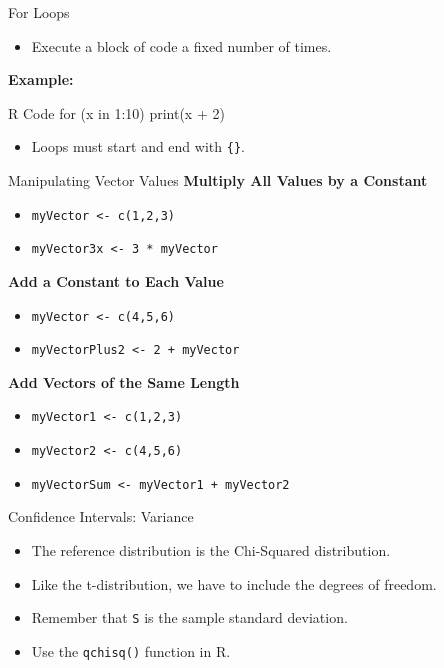 \documentclass{beamer}
\begin{document}
\begin{frame}{For Loops}
    \begin{itemize}
        \item Execute a block of code a fixed number of times.
    \end{itemize}

    \textbf{Example:}
    \begin{block}{R Code}
for (x in 1:10) {
    print(x + 2)
}
    \end{block}
    \begin{itemize}
        \item Loops must start and end with \texttt{\{\}}.
    \end{itemize}
\end{frame}

\begin{frame}{Manipulating Vector Values}
    \textbf{Multiply All Values by a Constant}
    \begin{itemize}
        \item \texttt{myVector <- c(1,2,3)}
        \item \texttt{myVector3x <- 3 * myVector}
    \end{itemize}

    \textbf{Add a Constant to Each Value}
    \begin{itemize}
        \item \texttt{myVector <- c(4,5,6)}
        \item \texttt{myVectorPlus2 <- 2 + myVector}
    \end{itemize}

    \textbf{Add Vectors of the Same Length}
    \begin{itemize}
        \item \texttt{myVector1 <- c(1,2,3)}
        \item \texttt{myVector2 <- c(4,5,6)}
        \item \texttt{myVectorSum <- myVector1 + myVector2}
    \end{itemize}
\end{frame}

\begin{frame}{Confidence Intervals: Variance}
    \begin{itemize}
        \item The reference distribution is the Chi-Squared distribution.
        \item Like the t-distribution, we have to include the degrees of freedom.
        \item Remember that \texttt{S} is the sample standard deviation.
        \item Use the \texttt{qchisq()} function in R.
    \end{itemize}
\end{frame}
\end{document}
